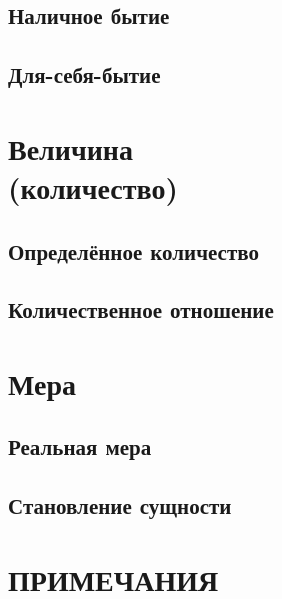 \documentclass[a5paper, 10pt, twoside, onecolumn, openany]{memoir}
\begin{document}


\section{Наличное бытие}


\section{Для-себя-бытие}


\chapter[Величина (количество)]{Величина\\(количество)}



\section{Определённое количество}


\section{Количественное отношение}


\chapter{Мера}



\section{Реальная мера}


\section{Становление сущности}


\backmatter


\renewcommand\appendixpagename{\ \vspace{16mm}\par\HUGE\bfseriesПРИЛОЖЕНИЯ}
\appendixpage*



\chapter[\mdseries Примечания]{ПРИМЕЧАНИЯ}


\clearpage
\tableofcontents*
\clearpage
\end{document}
